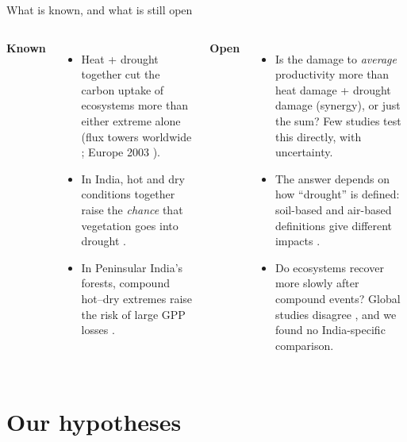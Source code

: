 \documentclass[11pt,aspectratio=169]{beamer}
\begin{document}
\begin{frame}{What is known, and what is still open}
  \footnotesize
  \begin{columns}[T]
    \textbf{\normalsize Known}
    \begin{itemize}
      \setlength{\itemsep}{4pt}
      \item Heat + drought together cut the carbon uptake of ecosystems more
        than either extreme alone (flux towers worldwide
        \citep{vonbuttlar2018}; Europe 2003 \citep{ciais2005}).
      \item In India, hot and dry conditions together raise the
        \emph{chance} that vegetation goes into drought \citep{meena2026}.
      \item In Peninsular India's forests, compound hot--dry extremes raise the
        risk of large GPP losses \citep{sen2026}.
    \end{itemize}
    \textbf{\normalsize Open}
    \begin{itemize}
      \setlength{\itemsep}{4pt}
      \item Is the damage to \emph{average} productivity more than heat damage
        + drought damage (synergy), or just the sum? Few studies test this
        directly, with uncertainty.
      \item The answer depends on how ``drought'' is defined: soil-based and
        air-based definitions give different impacts \citep{liang2026}.
      \item Do ecosystems recover more slowly after compound events? Global
        studies disagree \citep{yao2024,huang2025,feng2026}, and we found no
        India-specific comparison.
    \end{itemize}
  \end{columns}
\end{frame}

\section{Our hypotheses}
\end{document}

